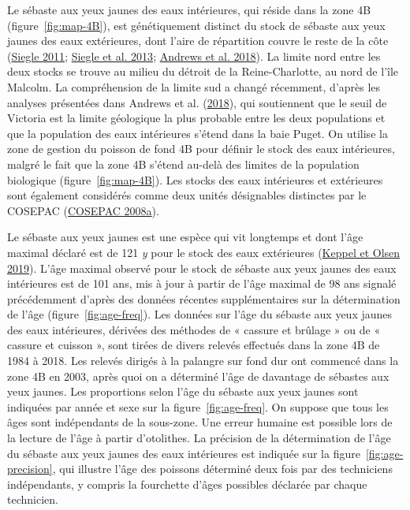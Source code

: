 \documentclass[french,11pt]{book}
\begin{document}
\clearpage

\Appendices


\clearpage

\label{app:biological-data}

Le sébaste aux yeux jaunes des eaux intérieures, qui réside dans la zone 4B (figure~\ref{fig:map-4B}), est génétiquement distinct du stock de sébaste aux yeux jaunes des eaux extérieures, dont l'aire de répartition couvre le reste de la côte (\protect\hyperlink{ref-siegle2011}{Siegle 2011}; \protect\hyperlink{ref-siegle2013}{Siegle et al. 2013}; \protect\hyperlink{ref-andrews2018}{Andrews et al. 2018}). La limite nord entre les deux stocks se trouve au milieu du détroit de la Reine-Charlotte, au nord de l'île Malcolm. La compréhension de la limite sud a changé récemment, d'après les analyses présentées dans Andrews et al. (\protect\hyperlink{ref-andrews2018}{2018}), qui soutiennent que le seuil de Victoria est la limite géologique la plus probable entre les deux populations et que la population des eaux intérieures s'étend dans la baie Puget. On utilise la zone de gestion du poisson de fond 4B pour définir le stock des eaux intérieures, malgré le fait que la zone 4B s'étend au-delà des limites de la population biologique (figure~\ref{fig:map-4B}). Les stocks des eaux intérieures et extérieures sont également considérés comme deux unités désignables distinctes par le COSEPAC (\protect\hyperlink{ref-cosewic2008}{COSEPAC 2008a}).

\hypertarget{sec:growth}{%
\label{sec:growth}}

Le sébaste aux yeux jaunes est une espèce qui vit longtemps et dont l'âge maximal déclaré est de 121 \emph{y} pour le stock des eaux extérieures (\protect\hyperlink{ref-keppel2019}{Keppel et Olsen 2019}). L'âge maximal observé pour le stock de sébaste aux yeux jaunes des eaux intérieures est de 101 ans, mis à jour à partir de l'âge maximal de 98 ans signalé précédemment d'après des données récentes supplémentaires sur la détermination de l'âge (figure~\ref{fig:age-freq}). Les données sur l'âge du sébaste aux yeux jaunes des eaux intérieures, dérivées des méthodes de « cassure et brûlage » ou de « cassure et cuisson », sont tirées de divers relevés effectués dans la zone 4B de 1984 à 2018. Les relevés dirigés à la palangre sur fond dur ont commencé dans la zone 4B en 2003, après quoi on a déterminé l'âge de davantage de sébastes aux yeux jaunes. Les proportions selon l'âge du sébaste aux yeux jaunes sont indiquées par année et sexe sur la figure~\ref{fig:age-freq}. On suppose que tous les âges sont indépendants de la sous-zone. Une erreur humaine est possible lors de la lecture de l'âge à partir d'otolithes. La précision de la détermination de l'âge du sébaste aux yeux jaunes des eaux intérieures est indiquée sur la figure~\ref{fig:age-precision}, qui illustre l'âge des poissons déterminé deux fois par des techniciens indépendants, y compris la fourchette d'âges possibles déclarée par chaque technicien.
\end{document}
